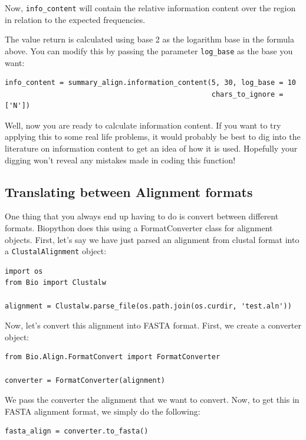 \documentclass{report}
\begin{document}
Now, \verb|info_content| will contain the relative information content over the region in relation to the expected frequencies.


The value return is calculated using base 2 as the logarithm base in the formula above. You can modify this by passing the parameter \verb|log_base| as the base you want:

\begin{verbatim}
info_content = summary_align.information_content(5, 30, log_base = 10
                                                 chars_to_ignore = ['N'])
\end{verbatim}

Well, now you are ready to calculate information content. If you want to try applying this to some real life problems, it would probably be best to dig into the literature on information content to get an idea of how it is used. Hopefully your digging won't reveal any mistakes made in coding this function!

\subsection{Translating between Alignment formats}
\label{sec:align_translate}

One thing that you always end up having to do is convert between different formats. Biopython does this using a FormatConverter class for alignment objects. First, let's say we have just parsed an alignment from clustal format into a \verb|ClustalAlignment| object:

\begin{verbatim}
import os
from Bio import Clustalw

alignment = Clustalw.parse_file(os.path.join(os.curdir, 'test.aln'))
\end{verbatim}

Now, let's convert this alignment into FASTA format. First, we create a converter object:

\begin{verbatim}
from Bio.Align.FormatConvert import FormatConverter

converter = FormatConverter(alignment)
\end{verbatim}

We pass the converter the alignment that we want to convert. Now, to get this in FASTA alignment format, we simply do the following:

\begin{verbatim}
fasta_align = converter.to_fasta()
\end{verbatim}
\end{document}
